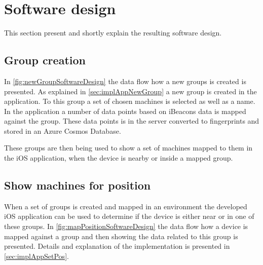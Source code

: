 \section{Software design}\label{sec:resultSoftwareDesign}
This section present and shortly explain the resulting software design.


\subsection{Group creation}\label{sec:resultsSoftwareDesignGroup}

In \cref{fig:newGroupSoftwareDesign} the data flow how a new groups is created is presented.
As explained in \cref{sec:implAppNewGroup} a new group is created in the application.
To this group a set of chosen machines is selected as well as a name.
In the application a number of data points based on iBeacons data is mapped against the group.
These data points is in the server converted to fingerprints and stored in an Azure Cosmos Database.

\bigskip

These groups are then being used to show a set of machines mapped to them in the iOS application, when the device is nearby or inside a mapped group.


\subsection{Show machines for position}\label{sec:resultsSoftwareDesignPos}

When a set of groups is created and mapped in an environment the developed iOS application can be used to determine if the device is either near or in one of these groups.
In \cref{fig:mapPositionSoftwareDesign} the data flow how a device is mapped against a group and then showing the data related to this group is presented.
Details and explanation of the implementation is presented in \cref{sec:implAppSetPos}.

